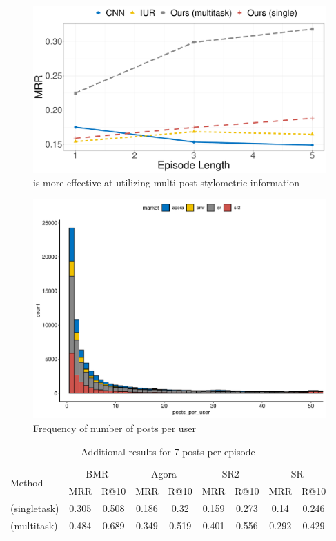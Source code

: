 \begin{figure}[!htbp]
    \centering
    \includegraphics[width=0.5\linewidth]{sysml/plots/length_comparison.pdf}
    \caption{\SYSMLmethodname{} is more effective at utilizing multi post stylometric information}
    \label{fig:len_comparison}
\end{figure}


\begin{figure}
    \centering
    \includegraphics[width=\linewidth]{sysml/plots/posts_histogram.pdf}
    \caption{Frequency of number of posts per user}
    \label{fig:posts_freq}
\end{figure}

\begin{table}[!htbp]
    \small
    \centering
		\begin{tabular}{lcccccccc}
 		\toprule
			\multirow{2}{*}{Method}	&\multicolumn{2}{c}{BMR}	&	\multicolumn{2}{c}{Agora}	&	\multicolumn{2}{c}{SR2}	&	\multicolumn{2}{c}{SR}\\
					&MRR&	R@10&	MRR&	R@10&	MRR&	R@10&	MRR&	R@10\\
		\midrule
			\SYSMLmethodname{}  (singletask) &	0.305	&	0.508	&	0.186	&	0.32	&	0.159	&	0.273	&	0.14	&	0.246	\\
				\hline
			\SYSMLmethodname{}  (multitask) &	0.484	& 0.689	&	0.349	&	0.519	&	0.401	&	0.556	&	0.292	&	0.429	\\
					\bottomrule
    	\end{tabular}
    	\caption{Additional results for 7 posts per episode}
      \label{tab:additional_res_7}
\end{table}

